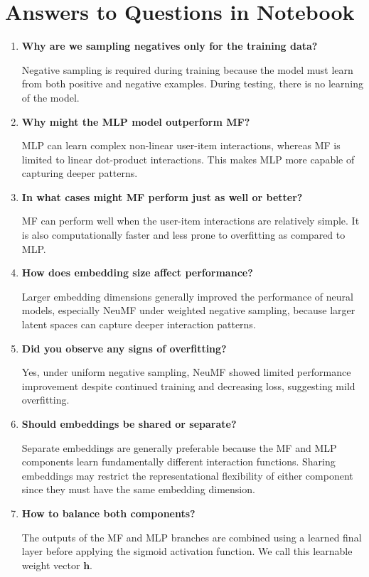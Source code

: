 \documentclass{article}
\begin{document}
\section{Answers to Questions in Notebook}

\begin{enumerate}

\item \textbf{Why are we sampling negatives only for the training data?}

Negative sampling is required during training because the model must learn from both positive and negative examples. During testing, there is no learning of the model.

\item \textbf{Why might the MLP model outperform MF?}

MLP can learn complex non-linear user-item interactions, whereas MF is limited to linear dot-product interactions. This makes MLP more capable of capturing deeper patterns.

\item \textbf{In what cases might MF perform just as well or better?}

MF can perform well when the user-item interactions are relatively simple. It is also computationally faster and less prone to overfitting as compared to MLP.

\item \textbf{How does embedding size affect performance?}

Larger embedding dimensions generally improved the performance of neural models, especially NeuMF under weighted negative sampling, because larger latent spaces can capture deeper interaction patterns.

\item \textbf{Did you observe any signs of overfitting?}

Yes, under uniform negative sampling, NeuMF showed limited performance improvement despite continued training and decreasing loss, suggesting mild overfitting.

\item \textbf{Should embeddings be shared or separate?}

Separate embeddings are generally preferable because the MF and MLP components learn fundamentally different interaction functions. Sharing embeddings may restrict the representational flexibility of either component since they must have the same embedding dimension.

\item \textbf{How to balance both components?}

The outputs of the MF and MLP branches are combined using a learned final layer before applying the sigmoid activation function. We call this learnable weight vector $\mathbf{h}$.

\end{enumerate}
\end{document}
